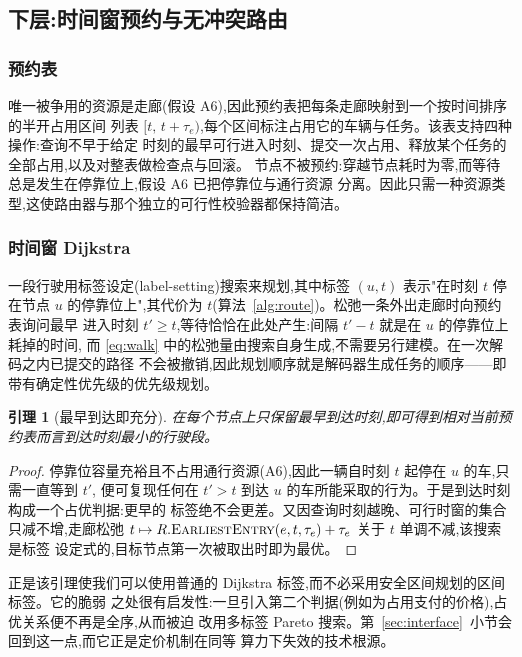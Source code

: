 \documentclass[manuscript,screen,review]{acmart}
\newtheorem{lem}{引理}
\begin{document}
\subsection{下层:时间窗预约与无冲突路由}
\label{sec:router}

\subsubsection{预约表}
唯一被争用的资源是走廊(假设 A6),因此预约表把每条走廊映射到一个按时间排序的半开占用区间
列表 $[t,\,t+\tau_e)$,每个区间标注占用它的车辆与任务。该表支持四种操作:查询不早于给定
时刻的最早可行进入时刻、提交一次占用、释放某个任务的全部占用,以及对整表做检查点与回滚。
节点不被预约:穿越节点耗时为零,而等待总是发生在停靠位上,假设 A6 已把停靠位与通行资源
分离。因此只需一种资源类型,这使路由器与那个独立的可行性校验器都保持简洁。

\subsubsection{时间窗 Dijkstra}
一段行驶用标签设定(label-setting)搜索来规划,其中标签 $(u,t)$ 表示"在时刻 $t$ 停在节点
$u$ 的停靠位上",其代价为 $t$(算法~\ref{alg:route})。松弛一条外出走廊时向预约表询问最早
进入时刻 $t'\ge t$,等待恰恰在此处产生:间隔 $t'-t$ 就是在 $u$ 的停靠位上耗掉的时间,
而 \eqref{eq:walk} 中的松弛量由搜索自身生成,不需要另行建模。在一次解码之内已提交的路径
不会被撤销,因此规划顺序就是解码器生成任务的顺序——即带有确定性优先级的优先级规划。

\begin{lem}[最早到达即充分]
\label{lem:label}
在每个节点上只保留最早到达时刻,即可得到相对当前预约表而言到达时刻最小的行驶段。
\end{lem}

\begin{proof}
停靠位容量充裕且不占用通行资源(A6),因此一辆自时刻 $t$ 起停在 $u$ 的车,只需一直等到 $t'$,
便可复现任何在 $t'>t$ 到达 $u$ 的车所能采取的行为。于是到达时刻构成一个占优判据:更早的
标签绝不会更差。又因查询时刻越晚、可行时窗的集合只减不增,走廊松弛
$t\mapsto R.\textsc{EarliestEntry}(e,t,\tau_e)+\tau_e$ 关于 $t$ 单调不减,该搜索是标签
设定式的,目标节点第一次被取出时即为最优。
\end{proof}

正是该引理使我们可以使用普通的 Dijkstra 标签,而不必采用安全区间规划的区间标签。它的脆弱
之处很有启发性:一旦引入第二个判据(例如为占用支付的价格),占优关系便不再是全序,从而被迫
改用多标签 Pareto 搜索。第~\ref{sec:interface}~小节会回到这一点,而它正是定价机制在同等
算力下失效的技术根源。
\end{document}
